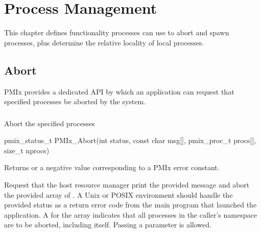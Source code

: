 \chapter{Process Management}
\label{chap:api_proc_mgmt}

This chapter defines functionality processes can use to abort and spawn processes, plus determine the relative locality of local processes.

\section{Abort}
\label{chap:api_proc_mgmt:abort}

\ac{PMIx} provides a dedicated API by which an application can request that specified processes be aborted by the system.

\subsection{}

\summary

Abort the specified processes

\format

\cspecificstart
\begin{codepar}
pmix_status_t
PMIx_Abort(int status, const char msg[],
           pmix_proc_t procs[], size_t nprocs)
\end{codepar}
\cspecificend

\begin{arglist}
\end{arglist}

Returns  or a negative value corresponding to a PMIx error constant.

\descr

Request that the host resource manager print the provided message and abort the provided array of .
A Unix or POSIX environment should handle the provided status as a return error code from the main program that launched the application.
A  for the  array indicates that all processes in the caller's namespace are to be aborted, including itself.
Passing a   parameter is allowed.

